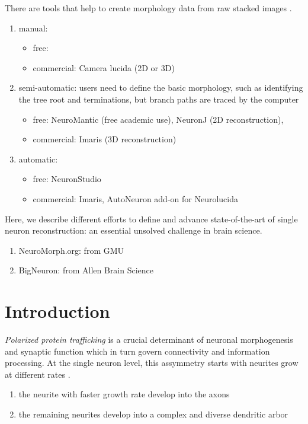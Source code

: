 There are tools that help to create morphology data from raw stacked images
\citep{myatt2012}.
\begin{enumerate}
  \item manual:
  \begin{itemize}
    \item free:
    
    \item commercial: Camera lucida (2D or 3D)
  \end{itemize}
  
  \item semi-automatic: users need  to define the basic morphology, such as
  identifying the tree root and terminations, but branch paths are traced by the computer
  \begin{itemize}
    \item free: NeuroMantic (free academic use),  NeuronJ (2D reconstruction), 
    
    \item commercial: Imaris (3D reconstruction)
    
  \end{itemize}
   
  \item automatic: 
  \begin{itemize}
    \item free: NeuronStudio
    \item commercial: Imaris, AutoNeuron add-on for Neurolucida 
  \end{itemize}
\end{enumerate}

Here, we describe different efforts to define and advance state-of-the-art of
single neuron reconstruction: an essential unsolved challenge in brain science.
\begin{enumerate}
  \item NeuroMorph.org: from GMU
  
  \item BigNeuron: from Allen Brain Science
\end{enumerate}




\section{Introduction}

{\it Polarized protein trafficking} is a crucial determinant of
neuronal morphogenesis and synaptic function which in
turn govern connectivity and information processing.
At the single neuron level, this assymmetry starts with 
neurites grow at different rates \citep{ramirez2011}.
\begin{enumerate}
  \item the neurite with faster growth rate develop into the axons
  
  \item the remaining neurites develop into a complex and diverse dendritic
  arbor
\end{enumerate}




